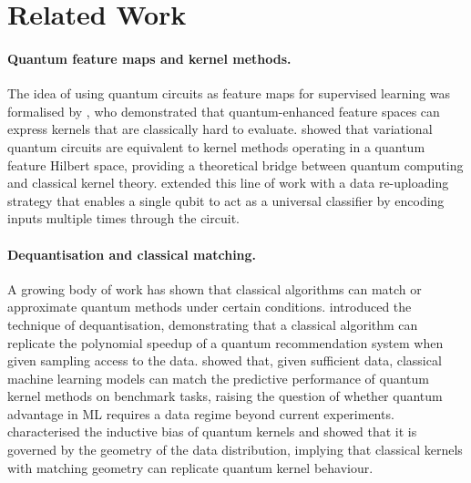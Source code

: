 \documentclass[12pt]{article}
\begin{document}
\section{Related Work}
\label{sec:related}

\paragraph{Quantum feature maps and kernel methods.}
The idea of using quantum circuits as feature maps for supervised learning
was formalised by \citet{havlicek2019}, who demonstrated that quantum-enhanced
feature spaces can express kernels that are classically hard to evaluate.
\citet{schuld2019} showed that variational quantum circuits are equivalent to
kernel methods operating in a quantum feature Hilbert space, providing a
theoretical bridge between quantum computing and classical kernel theory.
\citet{perez2020} extended this line of work with a data re-uploading strategy
that enables a single qubit to act as a universal classifier by encoding inputs
multiple times through the circuit.

\paragraph{Dequantisation and classical matching.}
A growing body of work has shown that classical algorithms can match or
approximate quantum methods under certain conditions.
\citet{tang2019} introduced the technique of dequantisation, demonstrating
that a classical algorithm can replicate the polynomial speedup of a quantum
recommendation system when given sampling access to the data.
\citet{huang2021} showed that, given sufficient data, classical machine
learning models can match the predictive performance of quantum kernel methods
on benchmark tasks, raising the question of whether quantum advantage in ML
requires a data regime beyond current experiments.
\citet{kubler2021} characterised the inductive bias of quantum kernels and
showed that it is governed by the geometry of the data distribution, implying
that classical kernels with matching geometry can replicate quantum kernel
behaviour.
\end{document}
